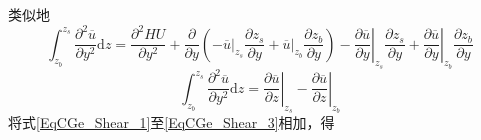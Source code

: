                                            类似地
                                            \begin{equation}
                                              \int_{z_{b}}^{ z_{s}}\!
                                              \frac{\partial^{2} \overline{u}}{\partial y^{2}}
                                              \mathrm{d}z
                                              =
                                              \frac{\partial^{2} HU}{\partial y^{2}} +
                                              \frac{\partial}{\partial y}
                                              \left(
                                                -
                                                \left.\overline{u}\right|_{z_{s}}\frac{\partial  z_{s}}{\partial y}
                                                  +
                                                  \left.\overline{u}\right|_{z_{b}}\frac{\partial z_{b}}{\partial y}
                                                  \right)
                                                  -
                                                  \left.\frac{\partial \overline{u}}{\partial y}\right|_{z_{s}}\frac{\partial  z_{s}}{\partial y}
                                                    +
                                                    \left.\frac{\partial \overline{u}}{\partial y}\right|_{z_{b}}\frac{\partial z_{b}}{\partial y}
                                                      \label{EqCGe_Shear_2}
                                                    \end{equation}
                                                    \begin{equation}
                                                      \int_{z_{b}}^{ z_{s}}\!
                                                      \frac{\partial^{2} \overline{u}}{\partial y^{2}}
                                                      \mathrm{d}z
                                                      =
                                                      \left.\frac{\partial \overline{u}}{\partial z}\right|_{z_{s}}
                                                        -
                                                        \left.\frac{\partial \overline{u}}{\partial z}\right|_{z_{b}}
                                                          \label{EqCGe_Shear_3}
                                                        \end{equation}
                                                        将式\eqref{EqCGe_Shear_1}至\eqref{EqCGe_Shear_3}相加，得
